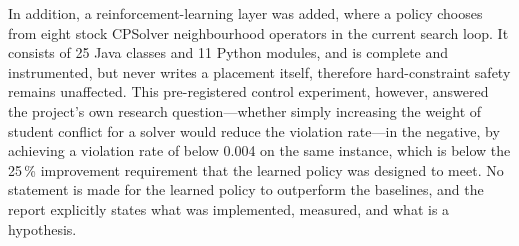 In addition, a reinforcement-learning layer was added, where a policy chooses from eight stock CPSolver neighbourhood operators in the current search loop. It consists of 25 Java classes and 11 Python modules, and is complete and instrumented, but never writes a placement itself, therefore hard-constraint safety remains unaffected. This pre-registered control experiment, however, answered the project's own research question---whether simply increasing the weight of student conflict for a solver would reduce the violation rate---in the negative, by achieving a violation rate of below 0.004 on the same instance, which is below the 25\,\% improvement requirement that the learned policy was designed to meet. No statement is made for the learned policy to outperform the baselines, and the report explicitly states what was implemented, measured, and what is a hypothesis.
